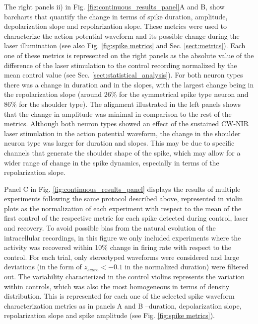 The right panels ii) in Fig. \ref{fig:continuous_results_panel}A and B, show barcharts that quantify the change in terms of spike duration, amplitude, depolarization slope and repolarization slope. These metrics were used to characterize the action potential waveform and its possible change during the laser illumination (see also Fig. \ref{fig:spike metrics} and Sec. \ref{sect:metrics}). Each one of these metrics is represented on the right panels as the absolute value of the difference of the laser stimulation to the control recording normalized by the mean control value (see Sec. \ref{sect:statistical_analysis}). For both neuron types there was a change in duration and in the slopes, with the largest change being in the repolarization slope (around 26\% for the symmetrical spike type neuron and 86\% for the shoulder type). The alignment illustrated in the left panels shows that the change in amplitude was minimal in comparison to the rest of the metrics. Although both neuron types showed an effect of the sustained CW-NIR laser stimulation in the action potential waveform, the change in the shoulder neuron type was larger for duration and slopes. This may be due to specific channels that generate the shoulder shape of the spike, which may allow for a wider range of change in the spike dynamics, especially in terms of the repolarization slope. 


Panel C in Fig. \ref{fig:continuous_results_panel} displays the results of multiple experiments following the same protocol described above, represented in violin plots as the normalization of each experiment with respect to the mean of the first control of the respective metric for each spike detected during control, laser and recovery. To avoid possible bias from the natural evolution of the intracellular recordings, in this figure we only included experiments where the activity was recovered within 10\% change in firing rate with respect to the control. For each trial, only stereotyped waveforms were considered and large deviations (in the form of $z_{score} < -0.1$ in the normalized duration) were filtered out. The variability characterized in the control violins represents the variation within controls, which was also the most homogeneous in terms of density distribution. This is represented for each one of the selected spike waveform characterization metrics as in panels A and B --duration, depolarization slope, repolarization slope and spike amplitude (see Fig. \ref{fig:spike metrics}).

